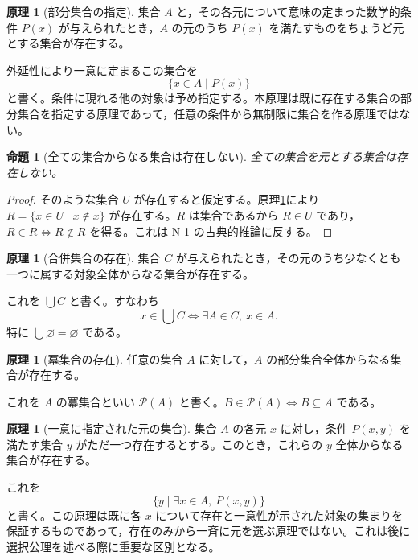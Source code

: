\documentclass[a5paper,10pt,dvipdfmx]{jsarticle}
\theoremstyle{definition}
\newtheorem{principle}[ruledef]{原理}
\theoremstyle{plain}
\newtheorem{prop}[ruledef]{命題}
\newcommand{\iffc}{\Longleftrightarrow}
\newcommand{\Pow}{\mathcal{P}}
\begin{document}
\begin{principle}[部分集合の指定]\label{k24}
集合 $A$ と，その各元について意味の定まった数学的条件 $P(x)$ が与えられたとき，$A$ の元のうち $P(x)$ を満たすものをちょうど元とする集合が存在する。
\end{principle}
外延性により一意に定まるこの集合を
\[
 \{x\in A\mid P(x)\}
\]
と書く。条件に現れる他の対象は予め指定する。本原理は既に存在する集合の部分集合を指定する原理であって，任意の条件から無制限に集合を作る原理ではない。
\begin{prop}[全ての集合からなる集合は存在しない]\label{k25}
全ての集合を元とする集合は存在しない。
\end{prop}
\begin{proof}
そのような集合 $U$ が存在すると仮定する。原理\ref{k24}により $R=\{x\in U\mid x\notin x\}$ が存在する。$R$ は集合であるから $R\in U$ であり，$R\in R\iffc R\notin R$ を得る。これは N-1 の古典的推論に反する。
\end{proof}
\begin{principle}[合併集合の存在]\label{k26}
集合 $C$ が与えられたとき，その元のうち少なくとも一つに属する対象全体からなる集合が存在する。
\end{principle}
これを $\bigcup C$ と書く。すなわち
\[
 x\in\bigcup C\iffc\exists A\in C,\ x\in A.
\]
特に $\bigcup\varnothing=\varnothing$ である。
\begin{principle}[冪集合の存在]\label{k27}
任意の集合 $A$ に対して，$A$ の部分集合全体からなる集合が存在する。
\end{principle}
これを $A$ の冪集合といい $\Pow(A)$ と書く。$B\in\Pow(A)\iffc B\subseteq A$ である。
\begin{principle}[一意に指定された元の集合]\label{k28}
集合 $A$ の各元 $x$ に対し，条件 $P(x,y)$ を満たす集合 $y$ がただ一つ存在するとする。このとき，これらの $y$ 全体からなる集合が存在する。
\end{principle}
これを
\[
 \{y\mid \exists x\in A,\ P(x,y)\}
\]
と書く。この原理は既に各 $x$ について存在と一意性が示された対象の集まりを保証するものであって，存在のみから一斉に元を選ぶ原理ではない。これは後に選択公理を述べる際に重要な区別となる。
\end{document}
